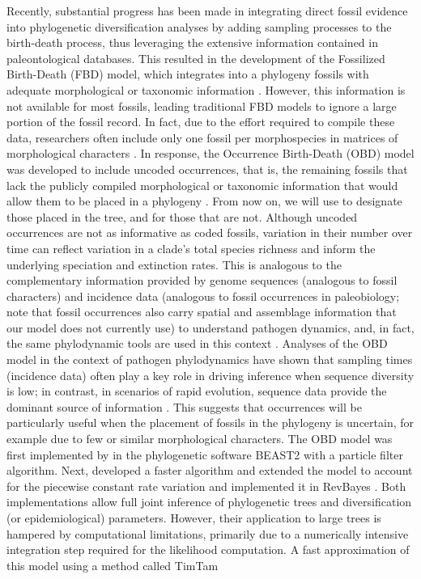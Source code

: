 \documentclass[oupdraft]{sysbio}
\newcommand{\revised}[1]{{\color{blue} #1}}
\begin{document}
Recently, substantial progress has been made in integrating direct fossil evidence into phylogenetic diversification analyses by adding sampling processes to the birth-death process, thus leveraging the extensive information contained in paleontological databases. This resulted in the development of the Fossilized Birth-Death (FBD) model, which integrates into a phylogeny fossils with adequate morphological or taxonomic information \citep{stadler_sampling-through-time_2010, heath_fossilized_2014}. However, this information is not available for most fossils, leading traditional FBD models to ignore a large portion of the fossil record. In fact, due to the effort required to compile these data, researchers often include only one fossil per morphospecies in matrices of morphological characters \citep{wright_integrating_2022}. In response, the Occurrence Birth-Death (OBD) model was developed to include \revised{uncoded} occurrences, that is, the remaining fossils that lack the publicly compiled morphological or taxonomic information that would allow them to be placed in a phylogeny \citep{vaughan_estimating_2019, gupta_probability_2020, andreoletti_occurrence_2022}. \revised{From now on, we will use  to designate those placed in the tree, and \say{uncoded occurrence} for those that are not.} Although \revised{uncoded} occurrences are not as informative as \revised{coded} fossils, variation in their number over time can reflect variation in a clade's total species richness and inform the underlying speciation and extinction rates. This is analogous to the complementary information provided by genome sequences (analogous to fossil characters) and incidence data \revised{(analogous to fossil occurrences in paleobiology; note that fossil occurrences also carry spatial and assemblage information that our model does not currently use)} to understand pathogen dynamics, and, in fact, the same phylodynamic tools are used in this context \citep{macpherson_unifying_2022, stadler_decoding_2024}. Analyses of the OBD model in the context of pathogen phylodynamics have shown that sampling times (incidence data) often play a key role in driving inference when sequence diversity is low; in contrast, in scenarios of rapid evolution, sequence data provide the dominant source of information \citep{featherstone_decoding_2023}. This suggests that occurrences will be particularly useful when the placement of fossils in the phylogeny is uncertain, for example due to few or similar morphological characters. The OBD model was first implemented by \citet{vaughan_estimating_2019} in the phylogenetic software BEAST2 \citep{bouckaert_beast_2019} with a particle filter algorithm. Next, \citet{gupta_probability_2020} developed a faster algorithm and \citet{andreoletti_occurrence_2022} extended the model to account for the piecewise constant rate variation and implemented it in RevBayes \citep{hohna_revbayes_2016}. Both implementations allow full joint inference of phylogenetic trees and diversification (or epidemiological) parameters. However, their application to large trees is hampered by computational limitations, primarily due to a numerically intensive integration step required for the likelihood computation. A fast approximation of this model using a method called TimTam 
\end{document}
